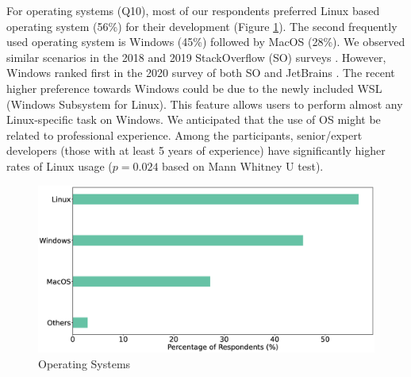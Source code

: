 
For operating systems (Q10), most of our
respondents preferred Linux based operating system (56\%) for their development (Figure \ref{fig:os}). The second frequently used
operating system is Windows (45\%) followed by MacOS (28\%). We
observed similar scenarios in the 2018 and 2019 StackOverflow (SO) surveys
\citep{StackoverflowSurvey2018,StackoverflowSurvey2019}. However, Windows ranked
first in the 2020 survey of both SO and JetBrains \citep{StackoverflowSurvey2020,
JetBrains2020}. The recent higher preference towards Windows could be due to the newly
included WSL (Windows Subsystem for Linux). This feature allows users to perform
almost any Linux-specific task on Windows. We anticipated that the use of OS
might be related to professional experience. Among the participants,
senior/expert developers (those with at least 5 years of experience) have significantly higher rates of Linux usage ($p=0.024$ based on Mann Whitney U test). 
\begin{figure}[h]
\centering
  \includegraphics[scale=0.17]{Figures/Respondents_os}
  \caption{Operating Systems}
  \label{fig:os}
\end{figure}


